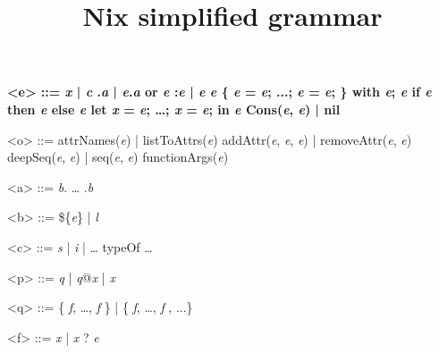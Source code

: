 \documentclass{article}
\title{Nix simplified grammar}
\date{}
\newcommand{\meta}[1]{{\it{#1}}} %
\renewcommand{\|}{\textrm{|}}
\def\e/{\meta{e}}
\def\a/{\meta{a}}
\def\b/{\meta{b}}
\def\c/{\meta{c}}
\def\p/{\meta{p}}
\def\q/{\meta{q}}
\def\f/{\meta{f}}
\def\x/{\meta{x}}
\def\o/{\meta{o}}
\begin{document}
\maketitle{}

\begin{grammar}
  \bfseries
  <e> ::=
    \x/ \| \c/
    \alt \e/.\a/ \| \e/.\a/ or \e/
    \alt \p/:\e/ \| \e/ \e/
    \alt \{ \e/ = \e/; ...; \e/ = \e/; \}
    \alt with \e/; \e/
    \alt if \e/ then \e/ else \e/
    \alt let \x/ = \e/; \ldots{;} \x/ = \e/; in \e/
    \alt Cons(\e/, \e/) \| nil
    \alt \o/

    <o> ::= attrNames(\e/) \| listToAttrs(\e/)
    \alt addAttr(\e/, \e/, \e/) \| removeAttr(\e/, \e/)
    \alt deepSeq(\e/, \e/) \| seq(\e/, \e/)
    \alt functionArgs(\e/)

  <a> ::= \b/. \ldots{} .\b/

  <b> ::= \$\{\e/\} \| \meta{l}

  <c> ::= \meta{s} \| \meta{i} \| \ldots{}
    \alt typeOf
    \alt \ldots{}

  <p> ::= \q/ \| \q/@\x/ \| \x/

  <q> ::= \{ \f/, \ldots{,} \f/ \} \| \{ \f/, \ldots{,} \f/ , ...\}

  <f> ::= \x/ \| \x/ ? \e/

\end{grammar}
\end{document}
